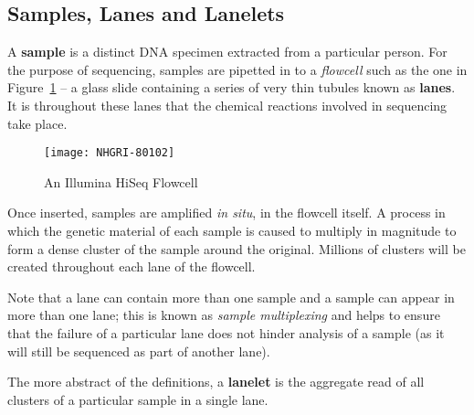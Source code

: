 \subsection{Samples, Lanes and Lanelets}
\label{chap:samplelanelanelets}
\ifpdf
    \graphicspath{{Chapter2/Figs/Raster/}{Chapter2/Figs/PDF/}{Chapter2/Figs/}}
\else
    \graphicspath{{Chapter2/Figs/Vector/}{Chapter2/Figs/}}
\fi

A \textbf{sample} is a distinct DNA specimen extracted from a particular person.
For the purpose of sequencing, samples are pipetted in to a \textit{flowcell}
such as the one in Figure~\ref{fig:flowcell} -- a glass slide
containing a series of very thin tubules known as \textbf{lanes}.  It is
throughout these lanes that the chemical reactions involved in sequencing take place.

\begin{figure}[htbp!]
    \centering
    \texttt{[image: NHGRI-80102]}
    \caption[flowcell]{An Illumina HiSeq Flowcell\citep{img:flowcell}}
    \label{fig:flowcell}
\end{figure}

Once inserted, samples are amplified \textit{in situ}, in the flowcell itself. A
process in which the genetic material of each sample is caused to multiply in
magnitude to form a dense cluster of the sample around the original. Millions of
clusters will be created throughout each lane of the flowcell.

Note that a lane can contain more than one sample and a sample can appear in
more than one lane; this is known as \textit{sample multiplexing} and helps to
ensure that the failure of a particular lane does not hinder analysis of a
sample (as it will still be sequenced as part of another lane).

The more abstract of the definitions, a \textbf{lanelet} is the aggregate read
of all clusters of a particular sample in a single lane.




